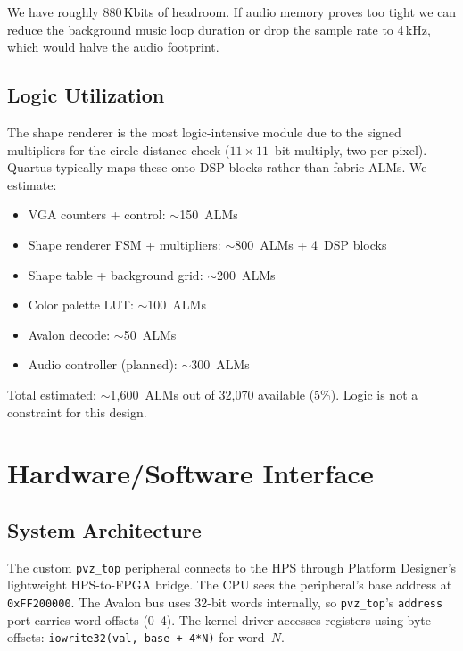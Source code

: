 \documentclass[11pt,letterpaper]{article}
\begin{document}
We have roughly 880\,Kbits of headroom. If audio memory proves too
tight we can reduce the background music loop duration or drop the
sample rate to 4\,kHz, which would halve the audio footprint.

\subsection{Logic Utilization}

The shape renderer is the most logic-intensive module due to the
signed multipliers for the circle distance check ($11 \times 11$~bit
multiply, two per pixel). Quartus typically maps these onto DSP blocks
rather than fabric ALMs. We estimate:

\begin{itemize}[nosep]
  \item VGA counters + control: $\sim$150~ALMs
  \item Shape renderer FSM + multipliers: $\sim$800~ALMs + 4~DSP blocks
  \item Shape table + background grid: $\sim$200~ALMs
  \item Color palette LUT: $\sim$100~ALMs
  \item Avalon decode: $\sim$50~ALMs
  \item Audio controller (planned): $\sim$300~ALMs
\end{itemize}

Total estimated: $\sim$1{,}600~ALMs out of 32{,}070 available (5\%).
Logic is not a constraint for this design.

\section{Hardware/Software Interface}
\label{sec:hwsw}

\subsection{System Architecture}

The custom \texttt{pvz\_top} peripheral connects to the HPS through
Platform Designer's lightweight HPS-to-FPGA bridge. The CPU sees the
peripheral's base address at \texttt{0xFF200000}. The Avalon bus uses
32-bit words internally, so \texttt{pvz\_top}'s \texttt{address} port
carries word offsets (0--4). The kernel driver accesses registers using
byte offsets: \texttt{iowrite32(val, base + 4*N)} for word~$N$.
\end{document}
